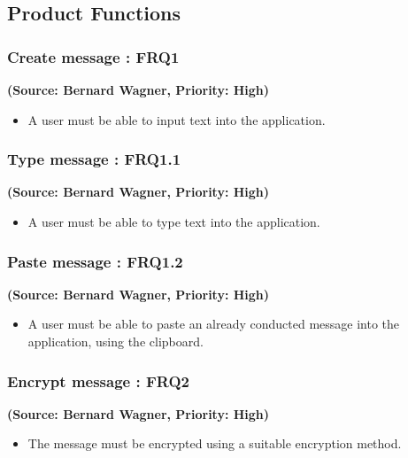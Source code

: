 \subsection{Product Functions}

\normalsize
\vspace{12pt}


\subsubsection{Create message : FRQ1}%
\textbf{(Source: Bernard Wagner, Priority: High)}
\begin{itemize}
\item A user must be able to input text into the application.
\end{itemize}
\subsubsection{Type message : FRQ1.1}
\textbf{(Source: Bernard Wagner, Priority: High)}
\begin{itemize}
\item A user must be able to type text into the application.
\end{itemize}
\subsubsection{Paste message : FRQ1.2}
\textbf{(Source: Bernard Wagner, Priority: High)}
\begin{itemize}
\item A user must be able to paste an already conducted message into the application, using the clipboard.
\end{itemize}
\subsubsection{Encrypt message : FRQ2}
\textbf{(Source: Bernard Wagner, Priority: High)}
\begin{itemize}
\item The message must be encrypted using a suitable encryption method.
\end{itemize}
